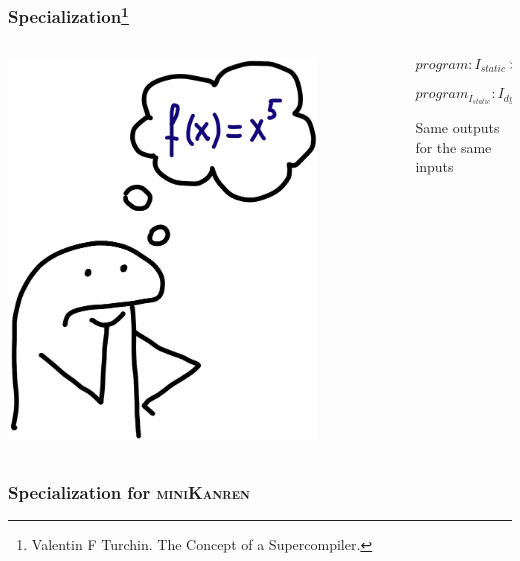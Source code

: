 \documentclass[xcolor={dvipsnames}, aspectratio=169]{beamer}
\newcommand{\mk}{\textsc{miniKanren}\xspace}
\begin{document}
\begin{frame}[fragile]
  \frametitle{Specialization\footnote{Valentin F Turchin. The Concept of a Supercompiler.}}

  \begin{columns}    
    \begin{column}{0.35\textwidth}
      \centering
      \includegraphics[width=0.8\textwidth]{pic/power.jpg}
    \end{column}
    \begin{column}{0.75\textwidth} 
\[
  program: I_{static} \times I_{dynamic} \to O 
\]

\[
  program_{I_{static}}: I_{dynamic} \to O 
\]

\vspace{0.5cm}

\begin{center}
  Same outputs for the same inputs
\end{center}
        \end{column}
        \end{columns}

\end{frame}

\begin{frame}[fragile]
  \frametitle{Specialization for \mk}

\end{frame}
\end{document}
